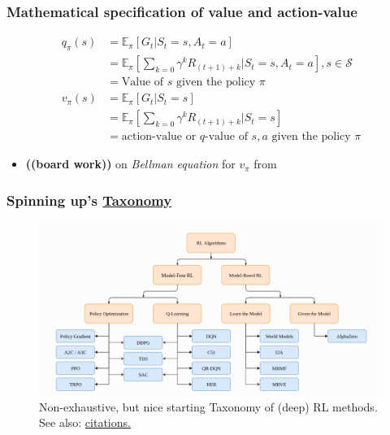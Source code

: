 \documentclass{beamer}
\begin{document}
\begin{frame}
  \frametitle{Mathematical specification of value and action-value}
  \begin{equation}
    \begin{aligned}
      q_\pi(s) &= \mathbb{E}_\pi[G_t|S_t = s, A_t = a] \\
      &= \mathbb{E}_\pi [\sum_{k=0} \gamma^k R_{(t + 1) + k} | S_t = s, A_t = a ], s \in \mathcal{S} \\
      &= \text{Value of $s$ given the policy $\pi$} \\
      v_\pi(s) &= \mathbb{E}_\pi[G_t|S_t = s] \\
      &= \mathbb{E}_\pi [\sum_{k=0} \gamma^k R_{(t + 1) + k} | S_t = s ] \\
      &= \text{action-value or $q$-value of $s,a$ given the policy $\pi$}
    \end{aligned}
  \end{equation}
  \begin{itemize}
  \item {\bf ((board work))} on {\em Bellman equation} for $v_\pi$ from \cite{Sutton2018}
  \end{itemize}
\end{frame}

\begin{frame}
  \frametitle{Spinning up's \href{https://spinningup.openai.com/en/latest/spinningup/rl_intro2.html}{Taxonomy}}
  \begin{figure}
    \label{fig:deep-rl-taxonomy}
    \includegraphics[width=\textwidth]{../images/spinup_rl_taxonomy.png}
    \caption{Non-exhaustive, but nice starting Taxonomy of (deep) RL methods. See also:
      \href{https://spinningup.openai.com/en/latest/spinningup/rl_intro2.html\#citations-below}{citations.}}
  \end{figure}
\end{frame}
\end{document}
